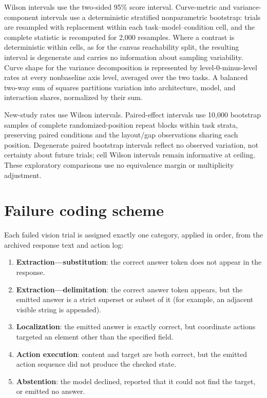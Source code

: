 \documentclass{article}
\begin{document}
Wilson intervals use the two-sided 95\% score interval. Curve-metric and variance-component intervals use a deterministic stratified nonparametric bootstrap: trials are resampled with replacement within each task--model--condition cell, and the complete statistic is recomputed for 2,000 resamples. Where a contrast is deterministic within cells, as for the canvas reachability split, the resulting interval is degenerate and carries no information about sampling variability. Curve shape for the variance decomposition is represented by level-0-minus-level rates at every nonbaseline axis level, averaged over the two tasks. A balanced two-way sum of squares partitions variation into architecture, model, and interaction shares, normalized by their sum.

New-study rates use Wilson intervals. Paired-effect intervals use 10,000 bootstrap samples of complete randomized-position repeat blocks within task strata, preserving paired conditions and the layout/gap observations sharing each position. Degenerate paired bootstrap intervals reflect no observed variation, not certainty about future trials; cell Wilson intervals remain informative at ceiling. These exploratory comparisons use no equivalence margin or multiplicity adjustment.

\section{Failure coding scheme}
\label{app:failurecoding}

Each failed vision trial is assigned exactly one category, applied in order, from the archived response text and action log:

\begin{enumerate}
  \item \textbf{Extraction---substitution}: the correct answer token does not appear in the response.
  \item \textbf{Extraction---delimitation}: the correct answer token appears, but the emitted answer is a strict superset or subset of it (for example, an adjacent visible string is appended).
  \item \textbf{Localization}: the emitted answer is exactly correct, but coordinate actions targeted an element other than the specified field.
  \item \textbf{Action execution}: content and target are both correct, but the emitted action sequence did not produce the checked state.
  \item \textbf{Abstention}: the model declined, reported that it could not find the target, or emitted no answer.
\end{enumerate}
\end{document}
